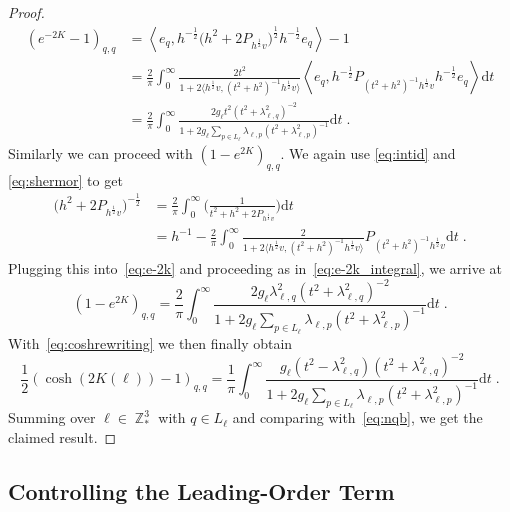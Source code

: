 \documentclass[12pt,a4paper]{article}
\numberwithin{equation}{section}
\newcommand{\1}{\mathbb{I}}
\DeclareMathOperator{\Z}{\mathbb{Z}}
\newcommand{\half}{\frac{1}{2}}
\newcommand{\eva}[1]{\left\langle #1 \right\rangle}
\theoremstyle{plain}
\theoremstyle{definition}
\theoremstyle{remark}
\theoremstyle{plain}
\theoremstyle{definition}
\theoremstyle{remark}
\begin{document}
\begin{proof}
\begin{align}
	(e^{-2K}-1)_{q,q}
	&= \eva{e_q, h^{-\half} \big(h^2 +2P_{h^{\half} v}\big)^{\half} h^{-\half} e_q} - 1\nonumber\\
	&= \frac{2}{\pi} \int_0^\infty \frac{2t^2}{1+ 2 \big\langle h^{\half} v ,(t^2+h^2)^{-1} h^\half v \big\rangle } \eva{e_q,h^{-\half} P_{(t^2+h^2)^{-1}h^{\half} v}h^{-\half} e_q}\mathrm{d}t\nonumber\\
	&= \frac{2}{\pi} \int_0^\infty \frac{2g_\ell t^2 (t^2+\lambda^2_{\ell,q})^{-2}}{1+ 2g_\ell\sum_{p \in L_\ell}\lambda_{\ell,p}(t^2+\lambda^2_{\ell,p})^{-1} } \mathrm{d}t \;. \label{eq:e-2k_integral}
\end{align}
Similarly we can proceed with $(1-e^{2K})_{q,q}$. We again use \eqref{eq:intid} and \eqref{eq:shermor} to get
\begin{align}
	\big(h^2 +2P_{h^{\half} v}\big)^{-\half}
	&= \frac{2}{\pi} \int_0^\infty \Bigg( \frac{1}{t^2+h^2 +2P_{h^{\half} v}} \Bigg)\mathrm{d}t\\
	&= h^{-1} - \frac{2}{\pi} \int_0^\infty \frac{2}{1+ 2 \big\langle h^{\half} v ,(t^2+h^2)^{-1} h^\half v \big\rangle }  P_{(t^2+h^2)^{-1}h^{\half} v}\mathrm{d}t \;. \label{eq:e2k}
\end{align}
Plugging this into~\eqref{eq:e-2k} and proceeding as in~\eqref{eq:e-2k_integral}, we arrive at
\begin{equation} \label{eq:e2kfin}
	(1-e^{2K})_{q,q}
	= \frac{2}{\pi} \int_0^\infty \frac{2g_\ell \lambda_{\ell,q}^2 (t^2+\lambda^2_{\ell,q})^{-2}}{1+ 2g_\ell\sum_{p \in L_{\ell}}\lambda_{\ell,p}(t^2+\lambda^2_{\ell,p})^{-1} } \mathrm{d}t \;.
\end{equation}
With~\eqref{eq:coshrewriting} we then finally obtain
\begin{equation}
	\half (\cosh(2K(\ell))-1)_{q,q} = \frac{1}{\pi} \int_0^\infty \frac{g_\ell (t^2-\lambda_{\ell,q}^2) (t^2+\lambda^2_{\ell,q})^{-2}}{1+ 2g_\ell\sum_{p \in L_{\ell}}\lambda_{\ell,p}(t^2+\lambda^2_{\ell,p})^{-1} } \mathrm{d}t \;.
\end{equation}
Summing over $ \ell \in \Z^3_* $ with $ q \in L_\ell $ and comparing with~\eqref{eq:nqb}, we get the claimed result.
\end{proof}




\subsection{Controlling the Leading-Order Term}
\label{subsec:control_nqb}
\end{document}
